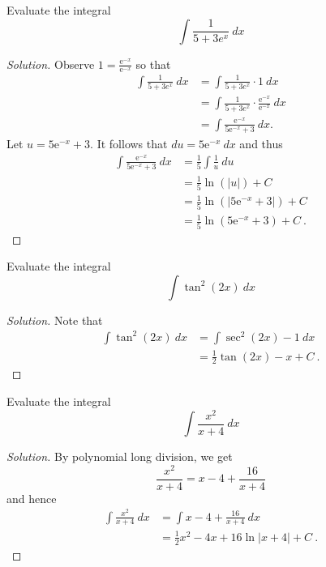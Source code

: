 \documentclass[compacto,10pt,comentarios]{aleph-notas}
\begin{document}
\begin{ejer}
    Evaluate the integral
    $$
        \int \frac{1}{5 + 3e^{x}} ~ dx
    $$
\end{ejer}
\begin{proof}[Solution]
    Observe $1 = \frac{\mathrm{e}^{-x}}{\mathrm{e}^{-x}}$ so that
    \begin{align*}
    \int \frac{1}{5 + 3e^{x}} ~ dx 
    & = \int \frac{1}{5 + 3e^{x}} \cdot 1 ~ dx \\
    & = \int \frac{1}{5 + 3e^{x}} \cdot \frac{\mathrm{e}^{-x}}{\mathrm{e}^{-x}} ~ dx \\ 
    & = \int \frac{\mathrm{e}^{-x}}{5\mathrm{e}^{-x} + 3} ~ dx .
    \end{align*}
    Let $u = 5\mathrm{e}^{-x} + 3$. It follows that $du = 5 \mathrm{e}^{-x} ~dx$ and thus
    \begin{align*}
        \int \frac{\mathrm{e}^{-x}}{5\mathrm{e}^{-x} + 3} ~ dx
        & = \frac{1}{5} \int \frac{1}{u} ~ du \\
        & = \frac{1}{5} \ln(|u|) + C \\
        & = \frac{1}{5} \ln(|5\mathrm{e}^{-x} + 3|) + C \\
        & = \frac{1}{5} \ln(5\mathrm{e}^{-x} + 3) + C ~ .
    \end{align*}
\end{proof}

\begin{ejer}
    Evaluate the integral
    $$
        \int \tan^{2}(2x) ~ dx
    $$
\end{ejer}
\begin{proof}[Solution]
    Note that
    \begin{align*}
        \int \tan^{2}(2x) ~ dx 
        & = \int \sec^{2}(2x) - 1 ~ dx \\
        & = \frac{1}{2}\tan(2x) - x + C ~ .
    \end{align*}
\end{proof}

\begin{ejer}
    Evaluate the integral
    $$
        \int \frac{x^{2}}{x + 4} ~ dx
    $$
\end{ejer}
\begin{proof}[Solution]
    By polynomial long division, we get
    $$
        \frac{x^{2}}{x+4} = x - 4 + \frac{16}{x + 4}
    $$
    and hence
    \begin{align*}
        \int \frac{x^{2}}{x + 4} ~ dx
        & = \int x - 4 + \frac{16}{x + 4} ~ dx \\
        & = \frac{1}{2}x^{2} - 4x + 16 \ln|x + 4| + C ~ .
    \end{align*}
\end{proof}
\end{document}
